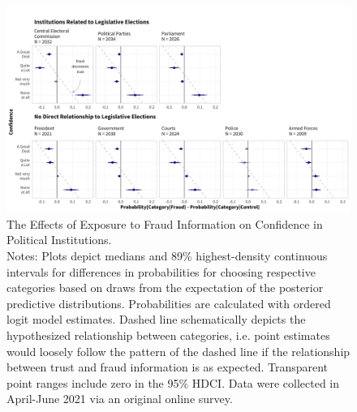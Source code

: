 \documentclass[11pt, ngerman,english,a4]{article}
\begin{document}
\begin{figure}[H]
	\centering
	\includegraphics[width=\linewidth,trim=4 4 4 4,clip]{figs/diffs_ol_main_pol.png}
	\caption{The Effects of Exposure to Fraud Information on Confidence in Political Institutions.  \\
		\footnotesize{Notes: Plots depict medians and 89\% highest-density continuous intervals for differences in probabilities for choosing respective categories based on draws from the expectation of the posterior predictive distributions. Probabilities are calculated with ordered logit model estimates.
			Dashed line schematically depicts the hypothesized relationship between categories, i.e. point estimates would loosely follow the pattern of the dashed line if the relationship between trust and fraud information is as expected. Transparent point ranges include zero in the 95\% HDCI.
	Data were collected in April-June 2021 via an original online survey.}}
	\singlespacing
	\raggedright
	\label{fig:main}
\end{figure}
\end{document}
